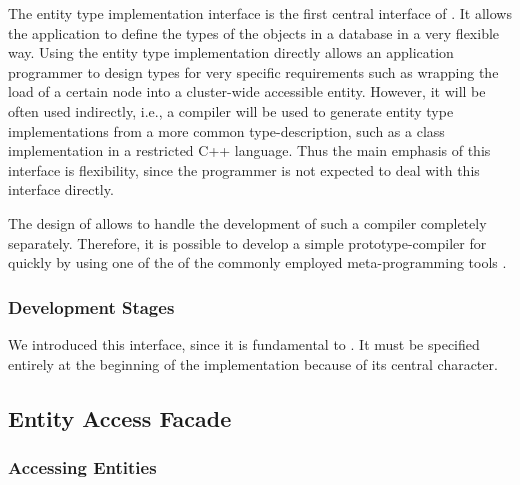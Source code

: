 \documentclass[a4paper, 10pt]{book}
\begin{document}
                The entity type implementation interface is the first central
                interface of \SYNEIGHT. It allows the application to define the types of
                the objects in a database in a very flexible way.
                Using the entity type implementation directly allows an application
                programmer to design types for very specific requirements such as
                wrapping the load of a certain node into a cluster-wide accessible
                entity. However, it will be often used indirectly, i.e., a compiler
                will be used to generate entity type implementations from a more
                common type-description, such as a class implementation in a
                restricted C++ language.
                Thus the main emphasis of this interface is flexibility, since the
                programmer is not expected to deal with this interface directly. 

                The design of \SYNEIGHT allows to handle the development of such a
                compiler completely separately. 
                Therefore, it is possible to develop a simple prototype-compiler for \SYNEIGHT
                quickly by using one of the of the commonly employed meta-programming
                tools  \cite{amano98lead,
                berger98evaluation, chibaopencxx, chiba97efficient, jpr98simplify,
                sugita98specialization, raverdy98dart, chiba98pattern,
                haraszti99iguana,raverdy98dart}.


                \subsubsection{Development Stages}


                We introduced this interface, since it is fundamental to \SYNEIGHT. It must
                be specified entirely at the beginning of the implementation because
                of its central character. 

                \subsection{Entity Access Facade}
                \label{sec:entity-access-facade}

                \subsubsection{Accessing Entities}
\end{document}
